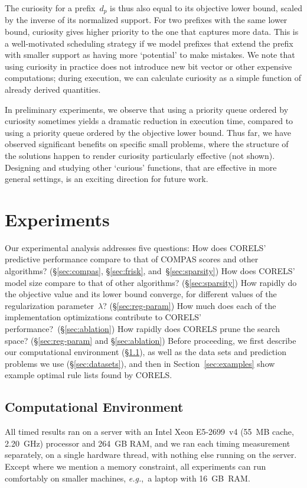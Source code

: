 \documentclass[twoside,11pt]{article}
\def\eg{{\it e.g.},~}
\def\Prefix{d_p}
\def\Reg{{\lambda}}
\begin{document}
The curiosity for a prefix~$\Prefix$ is thus also equal to its objective lower bound,
scaled by the inverse of its normalized support.
%
For two prefixes with the same lower bound, curiosity gives higher priority to
the one that captures more data.
%
This is a well-motivated scheduling strategy if we model prefixes that extend
the prefix with smaller support as having more `potential' to make mistakes.
%
We note that using curiosity in practice does not introduce new bit vector
or other expensive computations; during execution, we can calculate curiosity
as a simple function of already derived quantities.

In preliminary experiments, we observe that using a priority queue ordered by
curiosity sometimes yields a dramatic reduction in execution time,
compared to using a priority queue ordered by the objective lower bound.
%
Thus far, we have observed significant benefits on specific small problems,
where the structure of the solutions happen to render curiosity particularly
effective (not shown).
%
Designing and studying other `curious' functions, that are effective in more
general settings, is an exciting direction for future work.

\section{Experiments}
\label{sec:experiments}

Our experimental analysis addresses five questions:
%
How does CORELS' predictive performance compare to that of COMPAS scores
and other algorithms? (\S\ref{sec:compas}, \S\ref{sec:frisk}, and~\S\ref{sec:sparsity})
%
How does CORELS' model size compare to that of other algorithms? (\S\ref{sec:sparsity})
%
How rapidly do the objective value and its lower bound converge,
for different values of the regularization parameter~$\Reg$? (\S\ref{sec:reg-param})
%
How much does each of the implementation optimizations contribute to CORELS' performance?~(\S\ref{sec:ablation})
%
How rapidly does CORELS prune the search space? (\S\ref{sec:reg-param} and \S\ref{sec:ablation})
%
Before proceeding, we first describe our computational environment (\S\ref{sec:environment}),
as well as the data sets and prediction problems we use (\S\ref{sec:datasets}),
and then in Section~\ref{sec:examples} show example optimal rule lists found by CORELS.

\subsection{Computational Environment}
\label{sec:environment}
All timed results ran on a server with an Intel Xeon E5-2699~v4 (55~MB cache, 2.20~GHz) processor and 264~GB RAM,
and we ran each timing measurement separately, on a single hardware thread, with nothing else running on the server.
%
Except where we mention a memory constraint, all experiments
can run comfortably on smaller machines, \eg a laptop with 16~GB~RAM.
\end{document}
